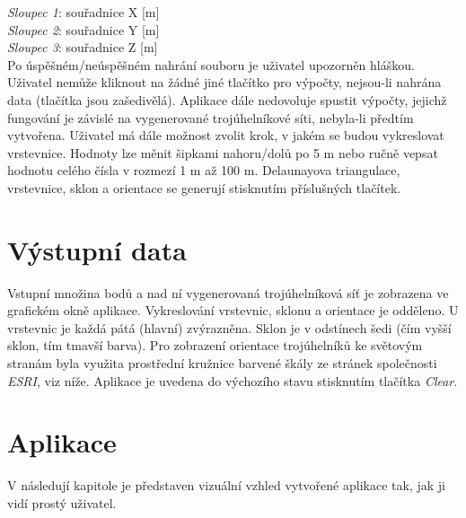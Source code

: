 \documentclass[a4paper, 12pt]{article}
\begin{document}
\noindent
\textit{Sloupec 1}: souřadnice X [m]\\
\textit{Sloupec 2}: souřadnice Y [m]\\
\textit{Sloupec 3}: souřadnice Z [m]\\

Po úspěšném/neúspěšném nahrání souboru je uživatel upozorněn hláškou. Uživatel nemůže kliknout na žádné jiné tlačítko pro výpočty, nejsou-li nahrána data (tlačítka jsou zašedivělá). Aplikace dále nedovoluje spustit výpočty, jejichž fungování je závislé na vygenerované trojúhelníkové síti, nebyla-li předtím vytvořena. Uživatel má dále možnost zvolit krok, v jakém se budou vykreslovat vrstevnice. Hodnoty lze měnit šipkami nahoru/dolů po 5 m nebo ručně vepsat hodnotu celého čísla v rozmezí 1 m až 100 m. Delaunayova triangulace, vrstevnice, sklon a orientace se generují stisknutím příslušných tlačítek.

\section{Výstupní data}
Vstupní množina bodů a nad ní vygenerovaná trojúhelníková síť je zobrazena ve grafickém okně aplikace. Vykreslování vrstevnic, sklonu a orientace je odděleno. U vrstevnic je každá pátá (hlavní) zvýrazněna. Sklon je v odstínech šedi (čím vyšší sklon, tím tmavší barva). Pro zobrazení orientace trojúhelníků ke světovým stranám byla využita prostřední kružnice barvené škály ze stránek společnosti \textit{ESRI}, viz níže. Aplikace je uvedena do výchozího stavu stisknutím tlačítka \textsl{Clear}.\\


\clearpage
\section{Aplikace}
V následují kapitole je představen vizuální vzhled vytvořené aplikace tak, jak ji vidí prostý uživatel.
\end{document}
